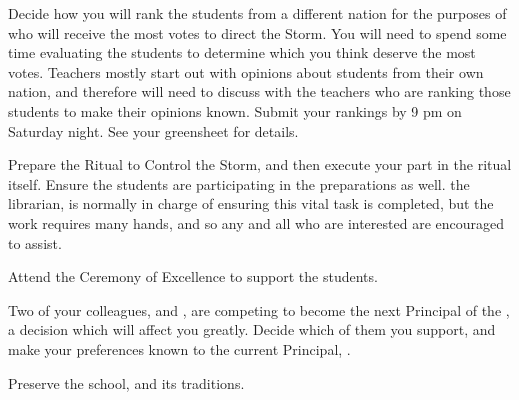 \documentclass[blue]{GL2020}
\begin{document}
\begin{itemz}[Goals]
	\item Decide how you will rank the students from a different nation for the purposes of who will receive the most votes to direct the Storm. You will need to spend some time evaluating the students to determine which you think deserve the most votes. Teachers mostly start out with opinions about students from their own nation, and therefore will need to discuss with the teachers who are ranking those students to make their opinions known. Submit your rankings by 9 pm on Saturday night. See your greensheet for details. 
	\item Prepare the Ritual to Control the Storm, and then execute your part in the ritual itself. Ensure the students are participating in the preparations as well. the librarian, \cLibrarian{\full} is normally in charge of ensuring this vital task is completed, but the work requires many hands, and so any and all who are interested are encouraged to assist.
	\item Attend the Ceremony of Excellence to support the students.
	\item Two of your colleagues, \cMusic{\full} and \cBeetle{\full}, are competing to become the next Principal of the \pSc{}, a decision which will affect you greatly. Decide which of them you support, and make your preferences known to the current Principal, \cPrincipal{\full}.
	\item Preserve the school, and its traditions.
\end{itemz}
\end{document}
